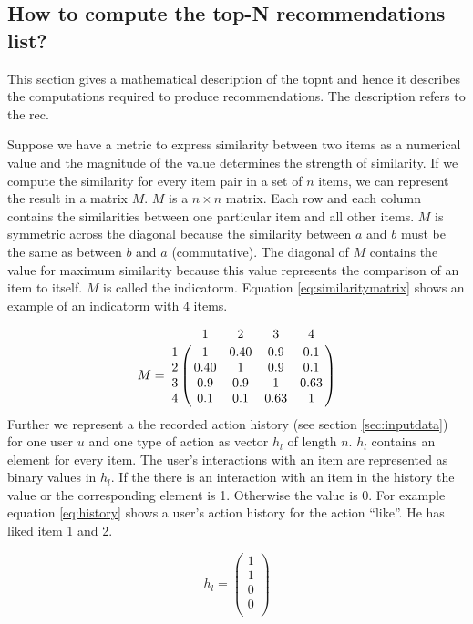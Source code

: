 \subsection{How to compute the top-N recommendations list?}
\label{sec:problem}
This section gives a mathematical description of the \gls{topnt} and hence it describes the computations required to produce recommendations. The description refers to the \gls{rec}.

Suppose we have a metric to express similarity between two items as a numerical value and the magnitude of the value determines the strength of similarity. If we compute the similarity for every item pair in a set of $n$ items, we can represent the result in a matrix $M$. $M$ is a $n \times n$ matrix. Each row and each column contains the similarities between one particular item and all other items. $M$ is symmetric across the diagonal because the similarity between $a$ and $b$ must be the same as between $b$ and $a$ (commutative). The diagonal of $M$ contains the value for maximum similarity because this value represents the comparison of an item to itself. $M$ is called the \gls{indicatorm}. Equation \ref{eq:similaritymatrix} shows an example of an \gls{indicatorm} with 4 items.

\begin{equation}
  \label{eq:similaritymatrix}
M =\bordermatrix{~ & 1 & 2 & 3 & 4 \cr
 1 & 1  & 0.40 & 0.9 & 0.1 \cr
2 & 0.40 &1  & 0.9 & 0.1 \cr
 3& 0.9 & 0.9 &1  & 0.63 \cr
 4 & 0.1 & 0.1 & 0.63 &1  \cr}
\end{equation}
Further we represent a the recorded action history (see section \ref{sec:inputdata}) for one user $u$ and one type of action as vector $h_l$ of length $n$. $h_l$ contains an element for every item. The user's interactions with an item are represented as binary values in $h_l$. If the there is an interaction with an item in the history the value or the corresponding element is 1. Otherwise the value is 0. For example equation \ref{eq:history} shows a user's action history for the action ``like''. He has liked item 1 and 2.

\begin{equation}
\label{eq:history}
h_l =
\begin{pmatrix}
 1 \\
 1 \\
 0 \\
 0 \\
\end{pmatrix}
\end{equation}

